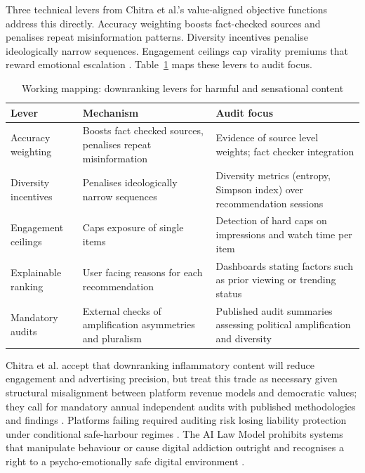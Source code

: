\documentclass[11pt]{article}
\begin{document}
Three technical levers from Chitra et al.'s value-aligned objective functions address this directly. Accuracy weighting boosts fact-checked sources and penalises repeat misinformation patterns. Diversity incentives penalise ideologically narrow sequences. Engagement ceilings cap virality premiums that reward emotional escalation \parencites[16]{6502223}. Table~\ref{tab:downranking_levers} maps these levers to audit focus. \begin{table}[H] \centering \caption{Working mapping: downranking levers for harmful and sensational content} \label{tab:downranking_levers} \begin{tabular}{p{3.3cm}p{4.8cm}p{4.3cm}} \hline Lever & Mechanism & Audit focus \\ \hline Accuracy weighting & Boosts fact checked sources, penalises repeat misinformation & Evidence of source level weights; fact checker integration \parencites[2252]{6502223} \\ Diversity incentives & Penalises ideologically narrow sequences & Diversity metrics (entropy, Simpson index) over recommendation sessions \parencites[2252]{6502223}[6]{5142478} \\ Engagement ceilings & Caps exposure of single items & Detection of hard caps on impressions and watch time per item \parencites[2252]{6502223} \\ Explainable ranking & User facing reasons for each recommendation & Dashboards stating factors such as prior viewing or trending status \parencites[2252]{6502223}[6]{5142478} \\ Mandatory audits & External checks of amplification asymmetries and pluralism & Published audit summaries assessing political amplification and diversity \parencites[2252]{6502223} \\ \hline \end{tabular} \end{table} Chitra et al. accept that downranking inflammatory content will reduce engagement and advertising precision, but treat this trade as necessary given structural misalignment between platform revenue models and democratic values; they call for mandatory annual independent audits with published methodologies and findings \parencites[2250]{6502223}[2252]{6502223}. Platforms failing required auditing risk losing liability protection under conditional safe-harbour regimes \parencites[2253]{6502223}. The AI Law Model prohibits systems that manipulate behaviour or cause digital addiction outright and recognises a right to a psycho-emotionally safe digital environment \parencites[61--62]{2977039}[119]{2977039}.
\end{document}
